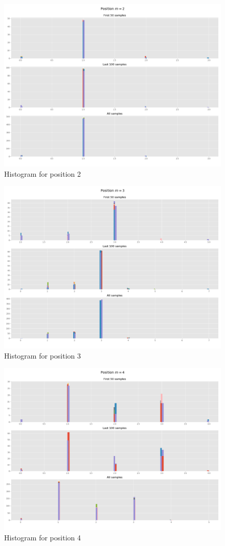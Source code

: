 \documentclass[]{article}
\begin{document}
\begin{figure}[H]
	\begin{center}
		
		\includegraphics[width=.5\textwidth]{task4/figures/T_2_4/Q2/distribution_pos2.png}
		\caption*{Histogram for position 2}
	\end{center}
\end{figure}

\begin{figure}[H]
	\begin{center}
		
		\includegraphics[width=.5\textwidth]{task4/figures/T_2_4/Q2/distribution_pos3.png}
		\caption*{Histogram for position 3}
	\end{center}
\end{figure}

\begin{figure}[H]
	\begin{center}
		
		\includegraphics[width=.5\textwidth]{task4/figures/T_2_4/Q2/distribution_pos4.png}
		\caption*{Histogram for position 4}
	\end{center}
\end{figure}
\end{document}

